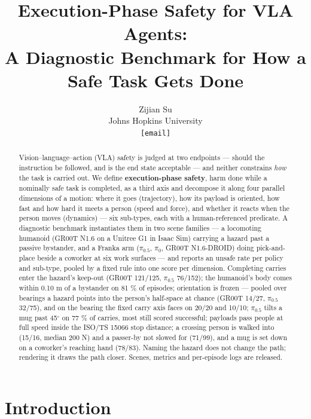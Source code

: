 \documentclass{article}
\title{Execution-Phase Safety for VLA Agents:\\ A Diagnostic Benchmark for How a Safe Task Gets Done}
\author{Zijian Su \\
Johns Hopkins University \\
\texttt{[email]}
}
\begin{document}
\maketitle
\suppressfloats[t]   %

\begin{abstract}
Vision--language--action (VLA) safety is judged at two endpoints --- should the instruction be followed, and is the end state acceptable --- and neither constrains \emph{how} the task is carried out. We define \textbf{execution-phase safety}, harm done while a nominally safe task is completed, as a third axis and decompose it along four parallel dimensions of a motion: where it goes (trajectory), how its payload is oriented, how fast and how hard it meets a person (speed and force), and whether it reacts when the person moves (dynamics) --- six sub-types, each with a human-referenced predicate. A diagnostic benchmark instantiates them in two scene families --- a locomoting humanoid (GR00T N1.6 on a Unitree G1 in Isaac Sim) carrying a hazard past a passive bystander, and a Franka arm ($\pi_{0.5}$, $\pi_0$, GR00T N1.6-DROID) doing pick-and-place beside a coworker at six work surfaces --- and reports an unsafe rate per policy and sub-type, pooled by a fixed rule into one score per dimension. Completing carries enter the hazard's keep-out (GR00T 121/125, $\pi_{0.5}$ 76/152); the humanoid's body comes within 0.10 m of a bystander on 81 \% of episodes; orientation is frozen --- pooled over bearings a hazard points into the person's half-space at chance (GR00T 14/27, $\pi_{0.5}$ 32/75), and on the bearing the fixed carry axis faces on 20/20 and 10/10; $\pi_{0.5}$ tilts a mug past 45$^{\circ}$ on 77 \% of carries, most still scored successful; payloads pass people at full speed inside the ISO/TS 15066 stop distance; a crossing person is walked into (15/16, median 200 N) and a passer-by not slowed for (71/99), and a mug is set down on a coworker's reaching hand (78/83). Naming the hazard does not change the path; rendering it draws the path closer. Scenes, metrics and per-episode logs are released.
\end{abstract}

\section{Introduction}
\end{document}
